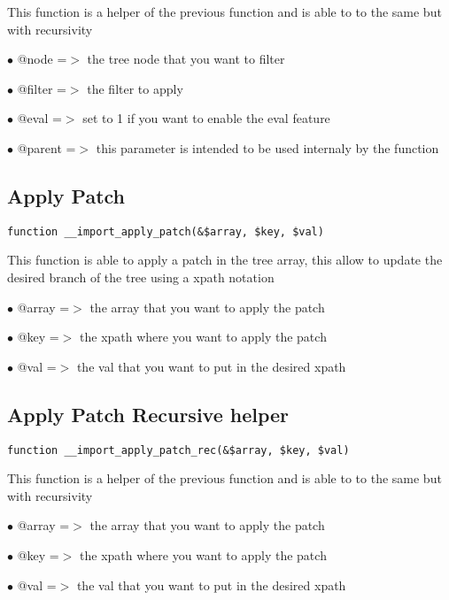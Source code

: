 \documentclass[a4paper]{book}
\begin{document}
This function is a helper of the previous function and is able to to the
same but with recursivity

\begin{compactitem}
\item[\color{myblue}$\bullet$] @node   =$>$ the tree node that you want to filter
\item[\color{myblue}$\bullet$] @filter =$>$ the filter to apply
\item[\color{myblue}$\bullet$] @eval   =$>$ set to 1 if you want to enable the eval feature
\item[\color{myblue}$\bullet$] @parent =$>$ this parameter is intended to be used internaly by the function
\end{compactitem}

\hypertarget{toc184}{}
\subsection{Apply Patch}

\begin{lstlisting}
function __import_apply_patch(&$array, $key, $val)
\end{lstlisting}

This function is able to apply a patch in the tree array, this allow to
update the desired branch of the tree using a xpath notation

\begin{compactitem}
\item[\color{myblue}$\bullet$] @array =$>$ the array that you want to apply the patch
\item[\color{myblue}$\bullet$] @key   =$>$ the xpath where you want to apply the patch
\item[\color{myblue}$\bullet$] @val   =$>$ the val that you want to put in the desired xpath
\end{compactitem}

\hypertarget{toc185}{}
\subsection{Apply Patch Recursive helper}

\begin{lstlisting}
function __import_apply_patch_rec(&$array, $key, $val)
\end{lstlisting}

This function is a helper of the previous function and is able to to the
same but with recursivity

\begin{compactitem}
\item[\color{myblue}$\bullet$] @array =$>$ the array that you want to apply the patch
\item[\color{myblue}$\bullet$] @key   =$>$ the xpath where you want to apply the patch
\item[\color{myblue}$\bullet$] @val   =$>$ the val that you want to put in the desired xpath
\end{compactitem}
\end{document}
